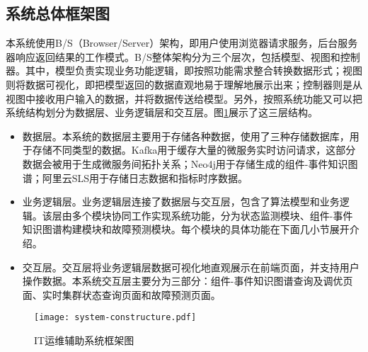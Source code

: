 \subsection{系统总体框架图}
本系统使用B/S（Browser/Server）架构，即用户使用浏览器请求服务，后台服务器响应返回结果的工作模式。B/S整体架构分为三个层次，包括模型、视图和控制器。其中，模型负责实现业务功能逻辑，即按照功能需求整合转换数据形式；视图则将数据可视化，即把模型返回的数据直观地易于理解地展示出来；控制器则是从视图中接收用户输入的数据，并将数据传送给模型。另外，按照系统功能又可以把系统结构划分为数据层、业务逻辑层和交互层。图\ref{system-constructure}展示了这三层结构。
\begin{itemize}
    \item [（1）]数据层。本系统的数据层主要用于存储各种数据，使用了三种存储数据库，用于存储不同类型的数据。Kafka用于缓存大量的微服务实时访问请求，这部分数据会被用于生成微服务间拓扑关系；Neo4j用于存储生成的组件-事件知识图谱；阿里云SLS用于存储日志数据和指标时序数据。
    \item [（2）]业务逻辑层。业务逻辑层连接了数据层与交互层，包含了算法模型和业务逻辑。该层由多个模块协同工作实现系统功能，分为状态监测模块、组件-事件知识图谱构建模块和故障预测模块。每个模块的具体功能在下面几小节展开介绍。
    \item [（3）]交互层。交互层将业务逻辑层数据可视化地直观展示在前端页面，并支持用户操作数据。本系统交互层主要分为三部分：组件-事件知识图谱查询及调优页面、实时集群状态查询页面和故障预测页面。
\end{itemize}

\begin{figure}[htbp]
    \centering
    \texttt{[image: system-constructure.pdf]}
    \caption{IT运维辅助系统框架图\label{system-constructure}}
\end{figure}

